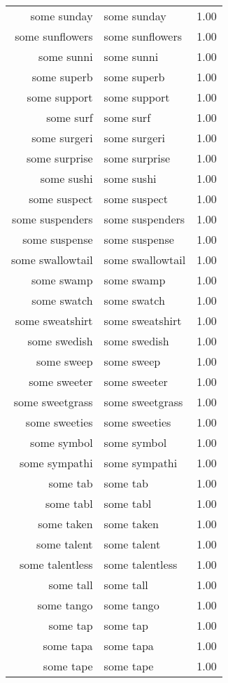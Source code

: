 \begin{table}[ht]
\begin{tabular}{rlr}
  some sunday & some sunday & 1.00 \\ 
  some sunflowers & some sunflowers & 1.00 \\ 
  some sunni & some sunni & 1.00 \\ 
  some superb & some superb & 1.00 \\ 
  some support & some support & 1.00 \\ 
  some surf & some surf & 1.00 \\ 
  some surgeri & some surgeri & 1.00 \\ 
  some surprise & some surprise & 1.00 \\ 
  some sushi & some sushi & 1.00 \\ 
  some suspect & some suspect & 1.00 \\ 
  some suspenders & some suspenders & 1.00 \\ 
  some suspense & some suspense & 1.00 \\ 
  some swallowtail & some swallowtail & 1.00 \\ 
  some swamp & some swamp & 1.00 \\ 
  some swatch & some swatch & 1.00 \\ 
  some sweatshirt & some sweatshirt & 1.00 \\ 
  some swedish & some swedish & 1.00 \\ 
  some sweep & some sweep & 1.00 \\ 
  some sweeter & some sweeter & 1.00 \\ 
  some sweetgrass & some sweetgrass & 1.00 \\ 
  some sweeties & some sweeties & 1.00 \\ 
  some symbol & some symbol & 1.00 \\ 
  some sympathi & some sympathi & 1.00 \\ 
  some tab & some tab & 1.00 \\ 
  some tabl & some tabl & 1.00 \\ 
  some taken & some taken & 1.00 \\ 
  some talent & some talent & 1.00 \\ 
  some talentless & some talentless & 1.00 \\ 
  some tall & some tall & 1.00 \\ 
  some tango & some tango & 1.00 \\ 
  some tap & some tap & 1.00 \\ 
  some tapa & some tapa & 1.00 \\ 
  some tape & some tape & 1.00 \\ 

\end{tabular}
\end{table}

